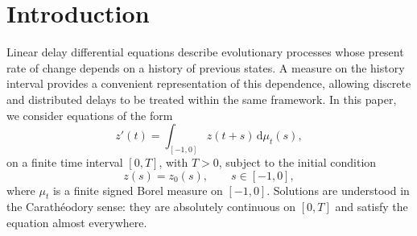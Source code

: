 \documentclass[reqno]{amsart}
\theoremstyle{plain}
\numberwithin{equation}{section}
\numberwithin{definition}{section}
\newcommand{\dd}{\ensuremath{\mathrm{d}}}
\begin{document}
\section*{Introduction} 

Linear delay differential equations describe evolutionary processes
whose present rate of change depends on a history of previous
states. A measure on the history interval provides a convenient
representation of this dependence, allowing discrete and
distributed delays to be treated within the same framework.
In this paper, we consider equations of the form
\begin{equation} \label{main-intro-eq}
    z'(t)
    =
    \int_{[-1,0]} z(t+s)\,\dd\mu_t(s),
\end{equation}
on a finite time interval $[0,T]$, with $T>0$, subject to
the initial condition
\begin{equation*}
    z(s)=z_0(s),
    \qquad s\in[-1,0],
\end{equation*}
where $\mu_t$ is a finite signed Borel measure on $[-1,0]$.
Solutions are understood in the Carath\'eodory sense:
they are absolutely continuous on $[0,T]$ and satisfy
the equation almost everywhere.
\end{document}
